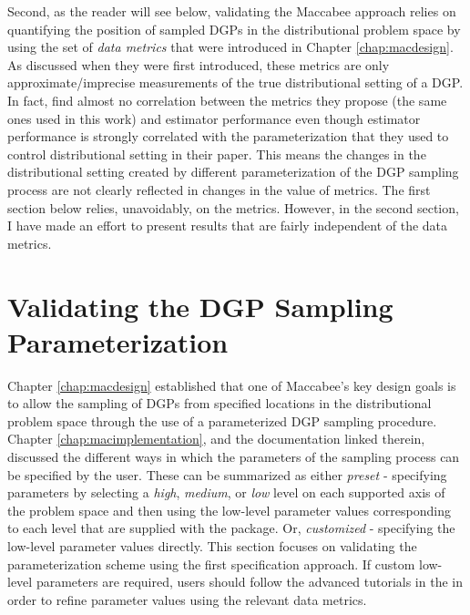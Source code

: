 \documentclass[../main.tex]{subfiles}
\begin{document}
Second, as the reader will see below, validating the Maccabee approach relies on quantifying the position of sampled DGPs in the distributional problem space by using the set of \textit{data metrics} that were introduced in Chapter \ref{chap:macdesign}. As discussed when they were first introduced, these metrics are only approximate/imprecise measurements of the true distributional setting of a DGP. In fact, \textcite{Dorie2019Automated1} find almost no correlation between the metrics they propose (the same ones used in this work) and estimator performance even though estimator performance is strongly correlated with the parameterization that they used to control distributional setting in their paper. This means the changes in the distributional setting created by different parameterization of the DGP sampling process are not clearly reflected in changes in the value of metrics. The first section below relies, unavoidably, on the metrics. However, in the second section, I have made an effort to present results that are fairly independent of the data metrics.

\section{Validating the DGP Sampling Parameterization}
\label{sec:validation-dgp-sampling}

Chapter \ref{chap:macdesign} established that one of Maccabee's key design goals is to allow the sampling of DGPs from specified locations in the distributional problem space through the use of a parameterized DGP sampling procedure. Chapter \ref{chap:macimplementation}, and the documentation linked therein, discussed the different ways in which the parameters of the sampling process can be specified by the user. These can be summarized as either \textit{preset} - specifying parameters by selecting a \textit{high}, \textit{medium}, or \textit{low} level on each supported axis of the problem space and then using the low-level parameter values corresponding to each level that are supplied with the package. Or, \textit{customized} - specifying the low-level parameter values directly. This section focuses on validating the parameterization scheme using the first specification approach. If custom low-level parameters are required, users should follow the advanced tutorials in the  in order to refine parameter values using the relevant data metrics.

\vspace{\baselineskip}
\end{document}
